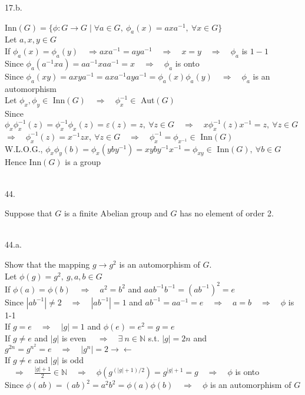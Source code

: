 \documentclass[12pt]{book}
\begin{document}
\begin{CJK}{UTF8}{bsmi}
17.b. \begin{minipage}[t]{\dimexpr\linewidth-2em}
Inn$(G)=\{\phi:G\rightarrow G\mid\forall a\in G,\  \phi_a(x)=axa^{-1},\ \forall x\in G\}$ \\
Let $a, x, y\in G$ \\
If $\phi_a(x)=\phi_a(y)\quad\Rightarrow axa^{-1}=aya^{-1}\quad\Rightarrow\quad x=y\quad\Rightarrow\quad\phi_a$ is $1-1$ \\
Since $\phi_a(a^{-1}xa)=aa^{-1}xaa^{-1}=x\quad\Rightarrow\quad\phi_a$ is onto \\
Since $\phi_a(xy)=axya^{-1}=axa^{-1}aya^{-1}=\phi_a(x)\phi_a(y)\quad\Rightarrow\quad\phi_a$ is an automorphism \\
Let $\phi_x, \phi_y\in$ Inn$(G)\quad\Rightarrow\quad\phi_x^{-1}\in$ Aut$(G)$ \\
Since $\phi_x\phi_x^{-1}(z)=\phi_x^{-1}\phi_x(z)=\varepsilon(z)=z,\ \forall z\in G\quad\Rightarrow\quad x\phi_x^{-1}(z)x^{-1}=z,\ \forall z\in G$ \\
$\Rightarrow\quad\phi_x^{-1}(z)=x^{-1}zx,\ \forall z\in G\quad\Rightarrow\quad\phi_x^{-1}=\phi_{x^{-1}}\in$ Inn$(G)$ \\
W.L.O.G., $\phi_x\phi_y(b)=\phi_x(yby^{-1})=xyby^{-1}x^{-1}=\phi_{xy}\in$ Inn$(G),\ \forall b\in G$ \\
Hence Inn$(G)$ is a group
\end{minipage} \\

44. \begin{minipage}[t]{\dimexpr\linewidth-2em}
Suppose that $G$ is a finite Abelian group and $G$ has no element of order 2.
\end{minipage} \\

44.a. \begin{minipage}[t]{\dimexpr\linewidth-2em}
Show that the mapping $g\rightarrow g^2$ is an automorphism of $G$. \\
Let $\phi(g)=g^2,\ g, a, b\in G$ \\
If $\phi(a)=\phi(b)\quad\Rightarrow\quad a^2=b^2$ and $aab^{-1}b^{-1}=(ab^{-1})^2=e$ \\
Since $|ab^{-1}|\ne2\quad\Rightarrow\quad|ab^{-1}|=1$ and $ab^{-1}=aa^{-1}=e\quad\Rightarrow\quad a=b\quad\Rightarrow\quad\phi$ is 1-1 \\
If $g=e\quad\Rightarrow\quad|g|=1$ and $\phi(e)=e^2=g=e$ \\
If $g\ne e$ and $|g|$ is even $\quad\Rightarrow\quad\exists\ n\in\mathbb{N}$ s.t. $|g|=2n$ and $g^{2n}=g^{n^2}=e\quad\Rightarrow\quad|g^n|=2\rightarrow\leftarrow$ \\
If $g\ne e$ and $|g|$ is odd $\quad\Rightarrow\quad\frac{|g|+1}{2}\in\mathbb{N}\quad\Rightarrow\quad\phi(g^{(|g|+1)/2})=g^{|g|+1}=g\quad\Rightarrow\quad\phi$ is onto \\
Since $\phi(ab)=(ab)^2=a^2b^2=\phi(a)\phi(b)\quad\Rightarrow\quad\phi$ is an automorphism of $G$
\end{minipage} \\


\end{CJK}
\end{document}
